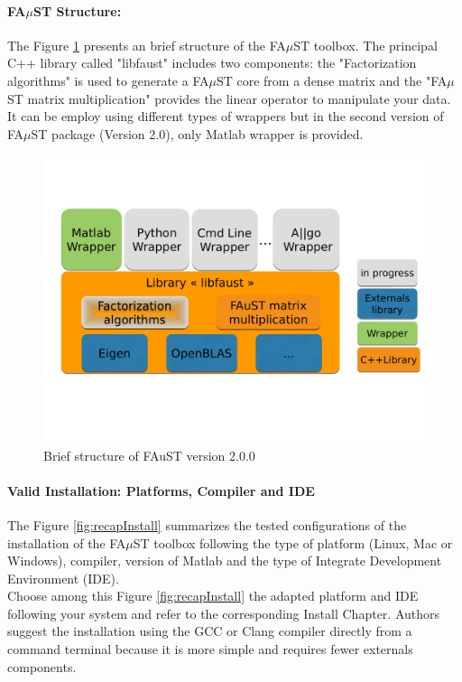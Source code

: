 \paragraph{FA$\mu$ST Structure:}
The Figure \ref{fig:faustStructure} presents an brief structure of the FA$\mu$ST toolbox. The principal C++ library called "libfaust" includes two components: the "Factorization algorithms" is used to generate a FA$\mu$ST core from a dense matrix and the "FA$\mu$ST matrix multiplication" provides the linear operator to manipulate your data. It can be employ using different types of wrappers but in the second version of FA$\mu$ST package (Version 2.0), only Matlab wrapper is provided. 


\begin{figure}[H] %
\centering
\includegraphics[scale=0.45,trim = 0cm 5cm 0cm 4cm, clip]{images/FaustStructure.pdf}
\caption{Brief structure of FAuST version 2.0.0}
\label{fig:faustStructure}
\end{figure}


\paragraph{Valid Installation: Platforms, Compiler and IDE}
The Figure \ref{fig:recapInstall} summarizes the tested configurations of the installation of the FA$\mu$ST toolbox following the type of platform (Linux, Mac or Windows), compiler, version of Matlab and the type of Integrate Development Environment (IDE).\\
Choose among this Figure \ref{fig:recapInstall} the adapted platform and IDE following your system and refer to the corresponding Install Chapter. Authors suggest the installation using the GCC or Clang compiler directly from a command terminal because it is more simple and requires fewer externals components. 

